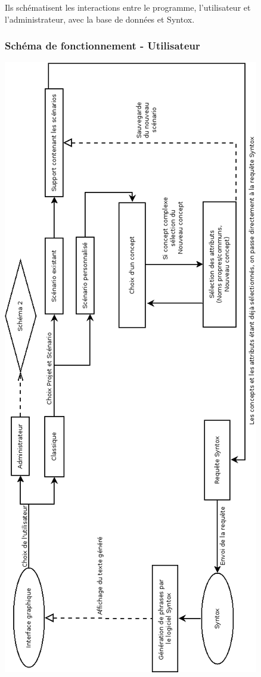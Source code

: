 \documentclass[12pt]{report}
\begin{document}
Ils schématisent les interactions entre le programme, l'utilisateur et l'administrateur, avec la base de données et Syntox.

	\subsubsection{Schéma de fonctionnement - Utilisateur}
	
	\includegraphics[scale=0.45]{FonctionnementUtilisateur.png}
	
\end{document}
